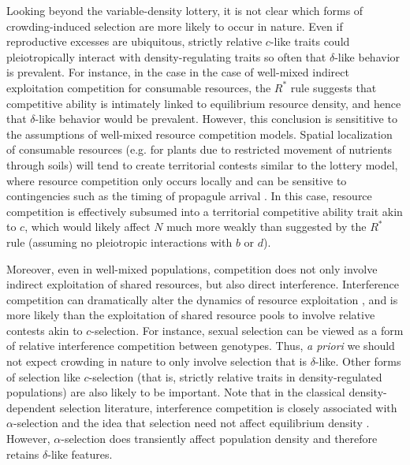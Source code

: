 \documentclass[12pt]{article}
\begin{document}
Looking beyond the variable-density lottery, it is not clear which forms of crowding-induced selection are more likely to occur in nature. Even if reproductive excesses are ubiquitous, strictly relative $c$-like traits could pleiotropically interact with density-regulating traits so often that $\delta$-like behavior is prevalent. For instance, in the case in the case of well-mixed indirect exploitation competition for consumable resources, the $R^*$ rule suggests that competitive ability is intimately linked to equilibrium resource density, and hence that $\delta$-like behavior would be prevalent. However, this conclusion is sensititive to the assumptions of well-mixed resource competition models. Spatial localization of consumable resources (e.g. for plants due to restricted movement of nutrients through soils) will tend to create territorial contests similar to the lottery model, where resource competition only occurs locally and can be sensitive to contingencies such as the timing of propagule arrival \citep{bolker_99}. In this case, resource competition is effectively subsumed into a territorial competitive ability trait akin to $c$, which would likely affect $N$ much more weakly than suggested by the $R^*$ rule (assuming no pleiotropic interactions with $b$ or $d$). 

Moreover, even in well-mixed populations, competition does not only involve indirect exploitation of shared resources, but also direct interference. Interference competition can dramatically alter the dynamics of resource exploitation \citep{case_1974,amarasekare_2002}, and is more likely than the exploitation of shared resource pools to involve relative contests akin to $c$-selection. For instance, sexual selection can be viewed as a form of relative interference competition between genotypes. Thus, \textit{a priori} we should not expect crowding in nature to only involve selection that is $\delta$-like. Other forms of selection like $c$-selection (that is, strictly relative traits in density-regulated populations) are also likely to be important. Note that in the classical density-dependent selection literature, interference competition is closely associated with $\alpha$-selection and the idea that selection need not affect equilibrium density \citep{gill_1974}. However, $\alpha$-selection does transiently affect population density and therefore retains $\delta$-like features.
\end{document}
